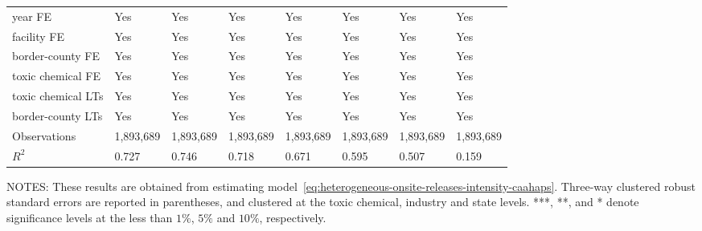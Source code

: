 \begin{table}[H]
{\begin{tabular}{@{}llllllll@{}}
            year FE                         & Yes       & Yes           & Yes       & Yes          & Yes             & Yes           & Yes                 \\
            facility FE                     & Yes       & Yes           & Yes       & Yes          & Yes             & Yes           & Yes                 \\
            border-county FE                & Yes       & Yes           & Yes       & Yes          & Yes             & Yes           & Yes                 \\
            toxic chemical FE               & Yes       & Yes           & Yes       & Yes          & Yes             & Yes           & Yes                 \\
            toxic chemical LTs              & Yes       & Yes           & Yes       & Yes          & Yes             & Yes           & Yes                 \\
            border-county LTs               & Yes       & Yes           & Yes       & Yes          & Yes             & Yes           & Yes                 \\ \midrule
            Observations                    & 1,893,689 & 1,893,689     & 1,893,689 & 1,893,689    & 1,893,689       & 1,893,689     & 1,893,689           \\
            $R^2$                           & 0.727     & 0.746         & 0.718     & 0.671        & 0.595           & 0.507         & 0.159               \\ \bottomrule \bottomrule
        \end{tabular}%
    }
    \begin{minipage}{\columnwidth}
        \vspace{0.05in}
        \tiny NOTES: These results are obtained from estimating model~\ref{eq:heterogeneous-onsite-releases-intensity-caahaps}. Three-way clustered robust standard errors are reported in parentheses, and clustered at the toxic chemical, industry and state levels. ***, **, and * denote significance levels at the less than $1\%$, $5\%$ and $10\%$, respectively.
    \end{minipage}
\end{table}